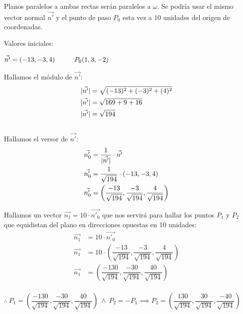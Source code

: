 \noindent Planos paralelos a ambas rectas serán paralelos a $\omega$. Se podría usar el mismo vector normal $\vec{n'}$ y el punto de paso $P_0$ esta vez a $10$ unidades del origen de coordenadas.

\noindent Valores iniciales:
\begin{center}
	$\vec{n'} = (-13, -3, 4) \hspace*{1cm} P_0(1, 3, -2)$
\end{center}

\begin{multicols}{2}
	\noindent Hallamos el módulo de $\vec{n'}$:
	\begin{align*}
		\lvert\vec{n'}\rvert & = \sqrt{(-13)^2 + (-3)^2 + (4)^2} \\
		\lvert\vec{n'}\rvert & = \sqrt{169 + 9 + 16}             \\
		\lvert\vec{n'}\rvert & = \sqrt{194}
	\end{align*}
	\columnbreak \\
	\noindent Hallamos el versor de $\vec{n'}$:
	\begin{align*}
		\vec{n'_0} & = \dfrac{1}{\lvert\vec{n'}\rvert} \cdot \vec{n'}                                             \\
		\vec{n'_0} & = \dfrac{1}{\sqrt{194}} \cdot (-13, -3, 4)                                             \\
		\vec{n'_0} & = \left(\dfrac{-13}{\sqrt{194}}, \dfrac{-3}{\sqrt{194}}, \dfrac{4}{\sqrt{194}} \right)
	\end{align*}
\end{multicols}

\noindent Hallamos un vector $\vec{n_1} = 10 \cdot \vec{n'_0}$ que nos servirá para hallar los puntos $P_1$ y $P_2$ que equidistan del plano en direcciones opuestas en 10 unidades:
\begin{align*}
	\vec{n_1} & = 10 \cdot \vec{n'_0}                                                                           \\
	\vec{n_1} & = 10 \cdot \left(\dfrac{-13}{\sqrt{194}}, \dfrac{-3}{\sqrt{194}}, \dfrac{4}{\sqrt{194}} \right) \\
	\vec{n_1} & = \left(\dfrac{-130}{\sqrt{194}}, \dfrac{-30}{\sqrt{194}}, \dfrac{40}{\sqrt{194}} \right)       \\
\end{align*}
\begin{center}
	$\therefore \ \boxed{P_1 = \left(\dfrac{-130}{\sqrt{194}}, \dfrac{-30}{\sqrt{194}}, \dfrac{40}{\sqrt{194}} \right)}
		\ \land \ P_2 = -P_1 \implies
		\boxed{P_2 = \left(\dfrac{130}{\sqrt{194}}, \dfrac{30}{\sqrt{194}}, \dfrac{-40}{\sqrt{194}} \right)}$
\end{center}


